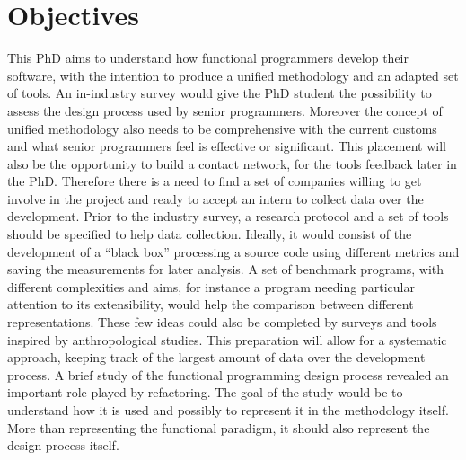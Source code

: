 \documentclass[12p]{article}
\begin{document}
\section*{Objectives}
This PhD aims to understand how functional programmers develop their
software, with the intention to produce a unified methodology and an
adapted set of tools. An in-industry survey would give the PhD student
the possibility to assess the design process used by senior
programmers. Moreover the concept of unified methodology also needs to
be comprehensive with the current customs and what senior programmers
feel is effective or significant. This placement will also be the
opportunity to build a contact network, for the tools feedback later
in the PhD. Therefore there is a need to find a set of companies
willing to get involve in the project and ready to accept an intern to
collect data over the development. Prior to the industry survey, a
research protocol and a set of tools should be specified to help data
collection. Ideally, it would consist of the development of a ``black
box'' processing a source code using different metrics and saving the
measurements for later analysis. A set of benchmark programs, with
different complexities and aims, for instance a program needing 
particular attention to its extensibility, would help the comparison
between different representations. These few ideas could also be
completed by surveys and tools inspired by anthropological
studies. This preparation will allow for a systematic approach,
keeping track of the largest amount of data over the development
process. A brief study of the functional programming design process
revealed an important role played by refactoring. The goal of the
study would be to understand how it is used and possibly to represent
it in the methodology itself. More than representing the functional
paradigm, it should also represent the design process itself.\\
\end{document}
